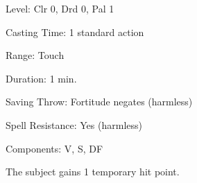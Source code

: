 
\begin{description*}
\item[Level:] Clr 0, Drd 0, Pal 1
\item[Casting Time:] 1 standard action
\item[Range:] Touch
\item[Duration:] 1 min.
\item[Saving Throw:] Fortitude negates (harmless)
\item[Spell Resistance:] Yes (harmless)
\item[Components:] V, S, DF
\end{description*}

The subject gains 1 temporary hit point.